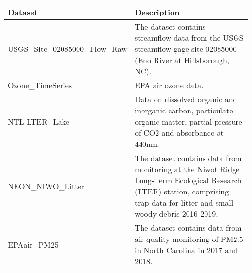 \documentclass[]{article}
\begin{document}
\begin{longtable}[]{@{}ll@{}}
\toprule
\begin{minipage}[b]{0.37\columnwidth}\raggedright
Dataset\strut
\end{minipage} & \begin{minipage}[b]{0.57\columnwidth}\raggedright
Description\strut
\end{minipage}\tabularnewline
\midrule
\endhead
\begin{minipage}[t]{0.37\columnwidth}\raggedright
USGS\_Site\_02085000\_Flow\_Raw\strut
\end{minipage} & \begin{minipage}[t]{0.57\columnwidth}\raggedright
The dataset contains streamflow data from the USGS streamflow gage site
02085000 (Eno River at Hillsborough, NC).\strut
\end{minipage}\tabularnewline
\begin{minipage}[t]{0.37\columnwidth}\raggedright
Ozone\_TimeSeries\strut
\end{minipage} & \begin{minipage}[t]{0.57\columnwidth}\raggedright
EPA air ozone data.\strut
\end{minipage}\tabularnewline
\begin{minipage}[t]{0.37\columnwidth}\raggedright
NTL-LTER\_Lake\strut
\end{minipage} & \begin{minipage}[t]{0.57\columnwidth}\raggedright
Data on dissolved organic and inorganic carbon, particulate organic
matter, partial pressure of CO2 and absorbance at 440nm.\strut
\end{minipage}\tabularnewline
\begin{minipage}[t]{0.37\columnwidth}\raggedright
NEON\_NIWO\_Litter\strut
\end{minipage} & \begin{minipage}[t]{0.57\columnwidth}\raggedright
The dataset contains data from monitoring at the Niwot Ridge Long-Term
Ecological Research (LTER) station, comprising trap data for litter and
small woody debris 2016-2019.\strut
\end{minipage}\tabularnewline
\begin{minipage}[t]{0.37\columnwidth}\raggedright
EPAair\_PM25\strut
\end{minipage} & \begin{minipage}[t]{0.57\columnwidth}\raggedright
The dataset contains data from air quality monitoring of PM2.5 in North
Carolina in 2017 and 2018.\strut
\end{minipage}\tabularnewline

\end{longtable}
\end{document}
